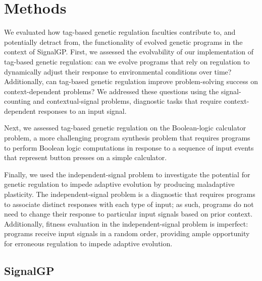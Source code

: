 \section{Methods}
\label{chapter:tag-based-regulation:sec:methods}

We evaluated how tag-based genetic regulation faculties contribute to, and potentially detract from, the functionality of evolved genetic programs in the context of SignalGP.
First, we assessed the evolvability of our implementation of tag-based genetic regulation: 
can we evolve programs that rely on regulation to dynamically adjust their response to environmental conditions over time? 
Additionally, can tag-based genetic regulation improve problem-solving success on context-dependent problems?
We addressed these questions using the signal-counting and contextual-signal problems, diagnostic tasks that require context-dependent responses to an input signal.

Next, we assessed tag-based genetic regulation on the Boolean-logic calculator problem, a more challenging program synthesis problem that requires programs to perform Boolean logic computations in response to a sequence of input events that represent button presses on a simple calculator. 

Finally, we used the independent-signal problem to investigate the potential for genetic regulation to impede adaptive evolution by producing maladaptive plasticity. 
The independent-signal problem is a diagnostic that requires programs to associate distinct responses with each type of input; as such, programs do not need to change their response to particular input signals based on prior context.
Additionally, fitness evaluation in the independent-signal problem is imperfect: programs receive input signals in a random order, providing ample opportunity for erroneous regulation to impede adaptive evolution.







\subsection{SignalGP}
\label{chapter:tag-based-regulation:sec:methods:signalgp}

